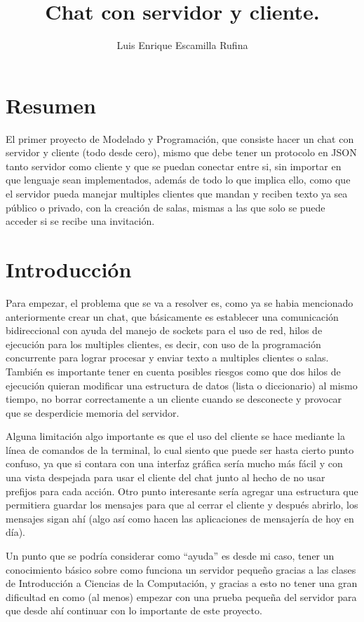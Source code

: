 \documentclass[12pt,letterpaper]{article}
\title{Chat con servidor y cliente.}
\author{Luis Enrique Escamilla Rufina}
\begin{document}
\maketitle
\thispagestyle{fancy} 

\section{Resumen}
El primer proyecto de Modelado y Programación, que consiste hacer un chat con servidor y cliente (todo desde cero), mismo que debe tener un protocolo en JSON tanto servidor como cliente y que se puedan conectar entre si, sin importar en que lenguaje sean implementados, además de todo lo que implica ello, como que el servidor pueda manejar multiples clientes que mandan y reciben texto ya sea público o privado, con la creación de salas, mismas a las que solo se puede acceder si se recibe una invitación.

\section{Introducción}
Para empezar, el problema que se va a resolver es, como ya se habia mencionado anteriormente crear un chat, que básicamente es establecer una comunicación bidireccional con ayuda del manejo de sockets para el uso de red, hilos de ejecución para los multiples clientes, es decir, con uso de la programación concurrente para lograr procesar y enviar texto a multiples clientes o salas. También es importante tener en cuenta posibles riesgos como que dos hilos de ejecución quieran modificar una estructura de datos (lista o diccionario) al mismo tiempo, no borrar correctamente a un cliente cuando se desconecte y provocar que se desperdicie memoria del servidor.

Alguna limitación algo importante es que el uso del cliente se hace mediante la línea de comandos de la terminal, lo cual siento que puede ser hasta cierto punto confuso, ya que si contara con una interfaz gráfica sería mucho más fácil y con una vista despejada para usar el cliente del chat junto al hecho de no usar prefijos para cada acción. Otro punto interesante sería agregar una estructura que permitiera guardar los mensajes para que al cerrar el cliente y después abrirlo, los mensajes sigan ahí (algo así como hacen las aplicaciones de mensajería de hoy en día).

Un punto que se podría considerar como ``ayuda'' es desde mi caso, tener un conocimiento básico sobre como funciona un servidor pequeño gracias a las clases de Introducción a Ciencias de la Computación, y gracias a esto no tener una gran dificultad en como (al menos) empezar con una prueba pequeña del servidor para que desde ahí continuar con lo importante de este proyecto.
\end{document}
